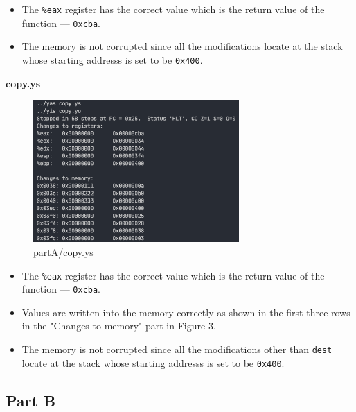 \documentclass{article}
\begin{document}
\begin{itemize}
        \item The \texttt{\%eax} register has the correct value which is the return value of the function --- \texttt{0xcba}.
        \item The memory is not corrupted since all the modifications locate at the stack whose starting addresss is set to be \texttt{0x400}.
\end{itemize}

\textbf{copy.ys}\\

\begin{figure}[H] %
        \centering %
        \includegraphics[width=0.7\textwidth]{partA-copy-bz.png} %
        \caption{partA/copy.ys} %
        \label{Fig.partA-copy} %
\end{figure}

\begin{itemize}
        \item The \texttt{\%eax} register has the correct value which is the return value of the function --- \texttt{0xcba}.
        \item Values are written into the memory correctly as shown in the first three rows in the "Changes to memory" part in Figure 3.
        \item The memory is not corrupted since all the modifications other than \texttt{dest} locate at the stack whose starting addresss is set to be \texttt{0x400}.
\end{itemize}

\subsection{Part B}
\end{document}

